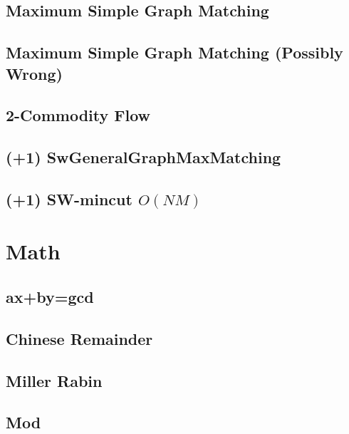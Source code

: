 \documentclass[10pt,twocolumn,oneside]{article}
\begin{document}
\subsection{Maximum Simple Graph Matching}


\subsection{Maximum Simple Graph Matching (Possibly Wrong)}


\subsection{2-Commodity Flow}


\subsection{(+1) SwGeneralGraphMaxMatching}


\subsection{(+1) SW-mincut $O(NM)$}


\section{Math}
\subsection{ax+by=gcd}


\subsection{Chinese Remainder}


\subsection{Miller Rabin}


\subsection{Mod}

\end{document}

